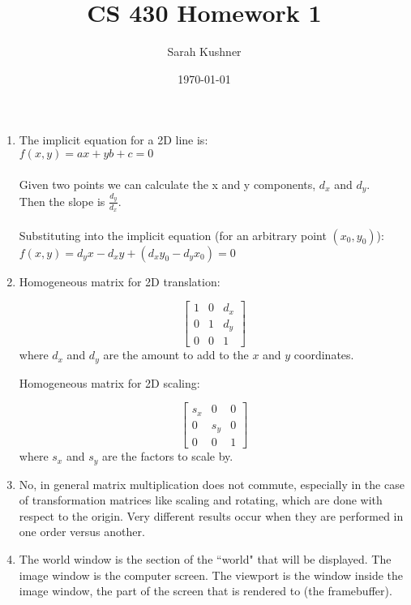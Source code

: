 \documentclass[12pt]{article}
\begin{document}
\title{CS 430 Homework 1}
\author{Sarah Kushner}
\date{\today}
\maketitle

\begin{enumerate}

\item 
The implicit equation for a 2D line is: \\
$f(x,y) = ax + yb + c = 0$ \\ \\

Given two points we can calculate the x and y components, $d_x$ and $d_y$. \\
Then the slope is $\frac{d_y}{d_x}$. \\ \\

Substituting into the implicit equation (for an arbitrary point $(x_0 , y_0)$): \\
$f(x,y) = d_y x - d_x y + (d_x y_0 - d_y x_0) = 0$

\item 
Homogeneous matrix for 2D translation: 

\[
\begin{bmatrix}
    1  & 0 & d_{x} \\
    0  & 1 & d_{y} \\
    0  & 0 & 1
\end{bmatrix}
\] where $d_{x}$ and $d_{y}$ are the amount to add to the $x$ and $y$ coordinates.

Homogeneous matrix for 2D scaling: 

\[
\begin{bmatrix}
    s_{x}  & 0 		& 0 \\
    0      & s_{y} 	& 0 \\
    0  	   & 0 		& 1
\end{bmatrix}
\] where $s_{x}$ and $s_{y}$ are the factors to scale by.

\item 
No, in general matrix multiplication does not commute, especially in the case of transformation matrices like scaling and rotating, which are done with respect to the origin. Very different results occur when they are performed in one order versus another.

\item 
The world window is the section of the ``world" that will be displayed.
The image window is the computer screen.
The viewport is the window inside the image window, the part of the screen that is rendered to (the framebuffer).


\end{enumerate}
\end{document}
